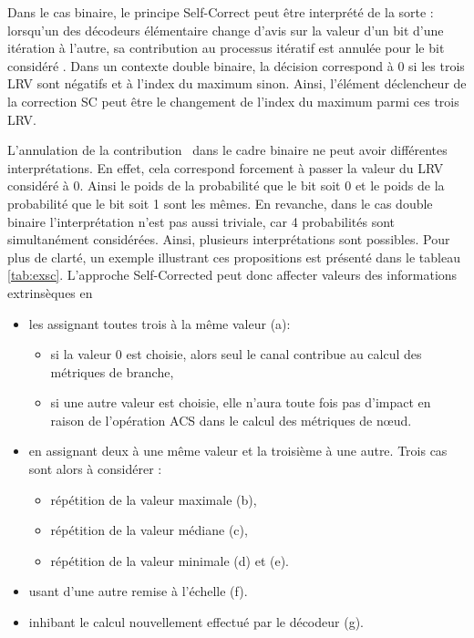 Dans le cas binaire, le principe Self-Correct peut être interprété de la sorte : \og lorsqu'un des décodeurs élémentaire 
change d'avis sur la valeur d'un bit d'une itération à l'autre, sa contribution au processus itératif est annulée pour 
le bit considéré \fg. Dans un contexte double binaire, la décision correspond à 0 si les trois LRV sont négatifs et à 
l'index du maximum sinon. Ainsi, l'élément déclencheur de la correction SC peut être le changement de l'index du maximum 
parmi ces trois LRV.

\og L'annulation de la contribution \fg ~dans le cadre binaire ne peut avoir différentes interprétations. En effet, cela 
correspond forcement à passer la valeur du LRV considéré à 0. Ainsi le poids de la probabilité que le bit soit 0 et 
le poids de la probabilité que le bit soit 1 sont les mêmes. En revanche, dans le cas double binaire l'interprétation n'est 
pas aussi triviale, car 4 probabilités sont simultanément considérées. Ainsi, plusieurs interprétations sont possibles. Pour plus 
de clarté, un exemple illustrant ces propositions est présenté dans le tableau \ref{tab:exsc}. L'approche Self-Corrected 
peut donc affecter valeurs des informations extrinsèques en 
\begin{itemize}
	\item les assignant toutes trois à la même valeur (a):
	\begin{itemize}
		\item si la valeur 0 est choisie, alors seul le canal contribue au calcul des métriques de branche,
		\item si une autre valeur est choisie, elle n'aura toute fois pas d'impact en raison de l’opération 
		ACS dans le calcul des métriques de nœud.
	\end{itemize}
	\item en assignant deux à une même valeur et la troisième à une autre. Trois cas sont alors à considérer :
	\begin{itemize}
		\item répétition de la valeur maximale (b),
		\item répétition de la valeur médiane (c),
		\item répétition de la valeur minimale (d) et (e).
	\end{itemize}
	\item usant d'une autre remise à l'échelle (f).
	\item inhibant le calcul nouvellement effectué par le décodeur (g).\\
\end{itemize}


